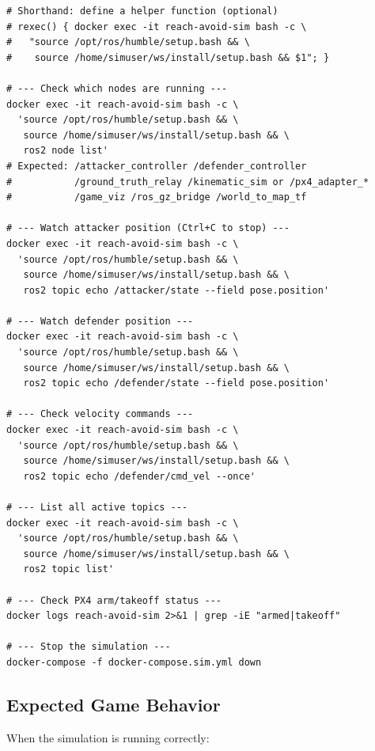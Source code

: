 \documentclass[11pt,a4paper]{article}
\begin{document}
\begin{lstlisting}[style=bashstyle]
# Shorthand: define a helper function (optional)
# rexec() { docker exec -it reach-avoid-sim bash -c \
#   "source /opt/ros/humble/setup.bash && \
#    source /home/simuser/ws/install/setup.bash && $1"; }

# --- Check which nodes are running ---
docker exec -it reach-avoid-sim bash -c \
  'source /opt/ros/humble/setup.bash && \
   source /home/simuser/ws/install/setup.bash && \
   ros2 node list'
# Expected: /attacker_controller /defender_controller
#           /ground_truth_relay /kinematic_sim or /px4_adapter_*
#           /game_viz /ros_gz_bridge /world_to_map_tf

# --- Watch attacker position (Ctrl+C to stop) ---
docker exec -it reach-avoid-sim bash -c \
  'source /opt/ros/humble/setup.bash && \
   source /home/simuser/ws/install/setup.bash && \
   ros2 topic echo /attacker/state --field pose.position'

# --- Watch defender position ---
docker exec -it reach-avoid-sim bash -c \
  'source /opt/ros/humble/setup.bash && \
   source /home/simuser/ws/install/setup.bash && \
   ros2 topic echo /defender/state --field pose.position'

# --- Check velocity commands ---
docker exec -it reach-avoid-sim bash -c \
  'source /opt/ros/humble/setup.bash && \
   source /home/simuser/ws/install/setup.bash && \
   ros2 topic echo /defender/cmd_vel --once'

# --- List all active topics ---
docker exec -it reach-avoid-sim bash -c \
  'source /opt/ros/humble/setup.bash && \
   source /home/simuser/ws/install/setup.bash && \
   ros2 topic list'

# --- Check PX4 arm/takeoff status ---
docker logs reach-avoid-sim 2>&1 | grep -iE "armed|takeoff"

# --- Stop the simulation ---
docker-compose -f docker-compose.sim.yml down
\end{lstlisting}

\subsection{Expected Game Behavior}

When the simulation is running correctly:
\end{document}
